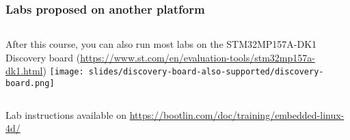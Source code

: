 \begin{frame}
\frametitle{Labs proposed on another platform}
  \begin{columns}
    After this course, you can also run most labs on the STM32MP157A-DK1 Discovery board
    (\url{https://www.st.com/en/evaluation-tools/stm32mp157a-dk1.html})
    \texttt{[image: slides/discovery-board-also-supported/discovery-board.png]}
  \end{columns}
  \vspace{1cm}
  Lab instructions available on
  \url{https://bootlin.com/doc/training/embedded-linux-4d/}
\end{frame}
